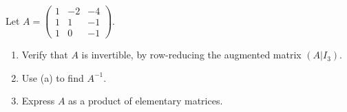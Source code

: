 \documentclass{eh-homework}
\begin{document}
    \newpage
    \begin{question}{2}
        Let \( A = \begin{pmatrix} 1 & -2 & -4 \\ 1 & 1 & -1 \\ 1 & 0 & -1 \end{pmatrix} \).

        \begin{enumerate}[label=(\alph*)]
            \item Verify that \( A \) is invertible, by row-reducing the augmented matrix \( (A | I_3) \).
            \item Use (a) to find \( A^{-1} \).
            \item Express \( A \) as a product of elementary matrices.
        \end{enumerate}
        \tcblower
        \ 
        

\end{question}
\end{document}
